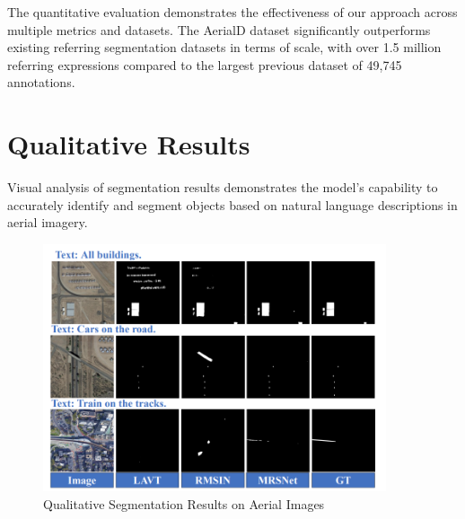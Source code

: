 \begin{table}[H]
\centering
\caption{Comparison with Existing RRSIS Datasets}
\label{tab:dataset_comparison}
\end{table}

The quantitative evaluation demonstrates the effectiveness of our approach across multiple metrics and datasets. The AerialD dataset significantly outperforms existing referring segmentation datasets in terms of scale, with over 1.5 million referring expressions compared to the largest previous dataset of 49,745 annotations.

\section{Qualitative Results}

Visual analysis of segmentation results demonstrates the model's capability to accurately identify and segment objects based on natural language descriptions in aerial imagery.

\begin{figure}[H]
\centering
\includegraphics[width=0.9\textwidth]{./Images/qualitative.png}
\caption{Qualitative Segmentation Results on Aerial Images}
\label{fig:qualitative_results}
\end{figure}

